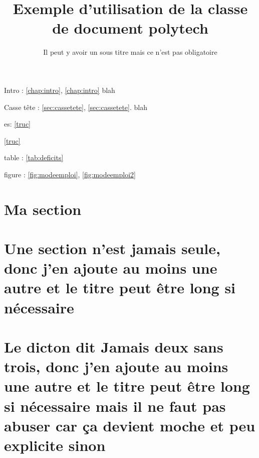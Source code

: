 \documentclass[overfullbox]{polytech}
\title{Exemple d'utilisation de la classe de document polytech}
\subtitle{Il peut y avoir un sous titre mais ce n'est pas obligatoire}
\begin{document}
\maketitle

Intro : \ref{chap:intro}, \ref{chap:intro} blah


Casse tête : \autoref{sec:cassetete}, \ref{sec:cassetete}. blah

es: \autoref{truc}

\eqref{truc}

table : \autoref{tab:deficits}

figure : \autoref{fig:modeemploi}, \autoref{fig:modeemploi2}




\label{chap:intro}

\lipsum[1]

\section{Ma section}

\lipsum[1-3]

\section{Une section n'est jamais seule, donc j'en ajoute au moins une autre et le titre peut être long si nécessaire}

\lipsum[1-3]


\section{Le dicton dit \og{}Jamais deux sans trois\fg{}, donc j'en ajoute au moins une autre et le titre peut être long si nécessaire mais il ne faut pas abuser car ça devient moche et peu explicite sinon}
\end{document}
